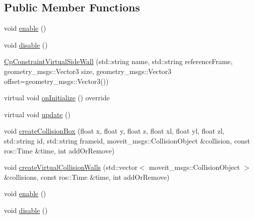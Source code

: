 \subsection*{Public Member Functions}
\begin{DoxyCompactItemize}
\item 
void \hyperlink{classsm__fetch__two__table__whiskey__pour_1_1cl__move__group__interface_1_1CpConstraintVirtualSideWall_a3664ab7add203ea576aa6f575b50b4a3}{enable} ()
\item 
void \hyperlink{classsm__fetch__two__table__whiskey__pour_1_1cl__move__group__interface_1_1CpConstraintVirtualSideWall_aaffa435c29c04bb3e6554d6f5931eca9}{disable} ()
\item 
\hyperlink{classsm__fetch__two__table__whiskey__pour_1_1cl__move__group__interface_1_1CpConstraintVirtualSideWall_aeafb3eca51b2871c91b40e87bc6384d2}{Cp\+Constraint\+Virtual\+Side\+Wall} (std\+::string name, std\+::string reference\+Frame, geometry\+\_\+msgs\+::\+Vector3 size, geometry\+\_\+msgs\+::\+Vector3 offset=geometry\+\_\+msgs\+::\+Vector3())
\item 
virtual void \hyperlink{classsm__fetch__two__table__whiskey__pour_1_1cl__move__group__interface_1_1CpConstraintVirtualSideWall_a7f052ec290f7cb7ee2b6a288b221b9a2}{on\+Initialize} () override
\item 
virtual void \hyperlink{classsm__fetch__two__table__whiskey__pour_1_1cl__move__group__interface_1_1CpConstraintVirtualSideWall_a0d810890cc65189012a33af233d18c9f}{update} ()
\item 
void \hyperlink{classsm__fetch__two__table__whiskey__pour_1_1cl__move__group__interface_1_1CpConstraintVirtualSideWall_ae495cc19dbaacf4cc7f4df803193ae92}{create\+Collision\+Box} (float x, float y, float z, float xl, float yl, float zl, std\+::string id, std\+::string frameid, moveit\+\_\+msgs\+::\+Collision\+Object \&collision, const ros\+::\+Time \&time, int add\+Or\+Remove)
\item 
void \hyperlink{classsm__fetch__two__table__whiskey__pour_1_1cl__move__group__interface_1_1CpConstraintVirtualSideWall_ad4ecafb1a6c5cc8f72f04643047c0b03}{create\+Virtual\+Collision\+Walls} (std\+::vector$<$ moveit\+\_\+msgs\+::\+Collision\+Object $>$ \&collisions, const ros\+::\+Time \&time, int add\+Or\+Remove)
\item 
void \hyperlink{classsm__fetch__two__table__whiskey__pour_1_1cl__move__group__interface_1_1CpConstraintVirtualSideWall_a3664ab7add203ea576aa6f575b50b4a3}{enable} ()
\item 
void \hyperlink{classsm__fetch__two__table__whiskey__pour_1_1cl__move__group__interface_1_1CpConstraintVirtualSideWall_aaffa435c29c04bb3e6554d6f5931eca9}{disable} ()

\end{DoxyCompactItemize}
